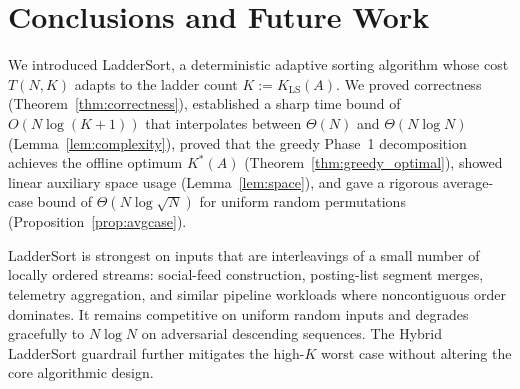 \documentclass[12pt,a4paper]{article}
\theoremstyle{plain}
\theoremstyle{definition}
\begin{document}
\section{Conclusions and Future Work}
\label{sec:conclusion}

We introduced LadderSort, a deterministic adaptive sorting algorithm whose
cost $T(N,K)$ adapts to the ladder count $K := K_{\mathrm{LS}}(A)$.  We
proved correctness (Theorem~\ref{thm:correctness}), established a sharp
time bound of $O(N\log(K+1))$ that interpolates between $\Theta(N)$ and $\Theta(N\log N)$
(Lemma~\ref{lem:complexity}), proved that the greedy Phase~1 decomposition
achieves the offline optimum $K^*(A)$ (Theorem~\ref{thm:greedy_optimal}),
showed linear auxiliary space usage (Lemma~\ref{lem:space}), and gave a
rigorous average-case bound of $\Theta(N\log\sqrt{N})$ for uniform random
permutations (Proposition~\ref{prop:avgcase}).

LadderSort is strongest on inputs that are interleavings of a small number of
locally ordered streams: social-feed construction, posting-list segment merges,
telemetry aggregation, and similar pipeline workloads where noncontiguous order
dominates.  It remains competitive on uniform random inputs and degrades
gracefully to $N\log N$ on adversarial descending sequences.  The Hybrid
LadderSort guardrail further mitigates the high-$K$ worst case without altering
the core algorithmic design.
\end{document}
